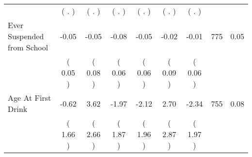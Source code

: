 \begin{tabular}{lcccccccc}
 & (        . ) & (        . ) & (        . ) & (        . ) & (        . ) & (        . ) & \\
Ever Suspended from School &     -0.05 &     -0.05 &     -0.08 &     -0.05 &     -0.02 &     -0.01 & 775 &       0.05 \\ 
 & (     0.05 ) & (     0.08 ) & (     0.06 ) & (     0.06 ) & (     0.09 ) & (     0.06 ) & \\
Age At First Drink &     -0.62 &      3.62 &     -1.97 &     -2.12 &      2.70 &     -2.34 & 755 &       0.08 \\ 
 & (     1.66 ) & (     2.66 ) & (     1.87 ) & (     1.96 ) & (     2.87 ) & (     1.97 ) & \\
\bottomrule
\end{tabular}
